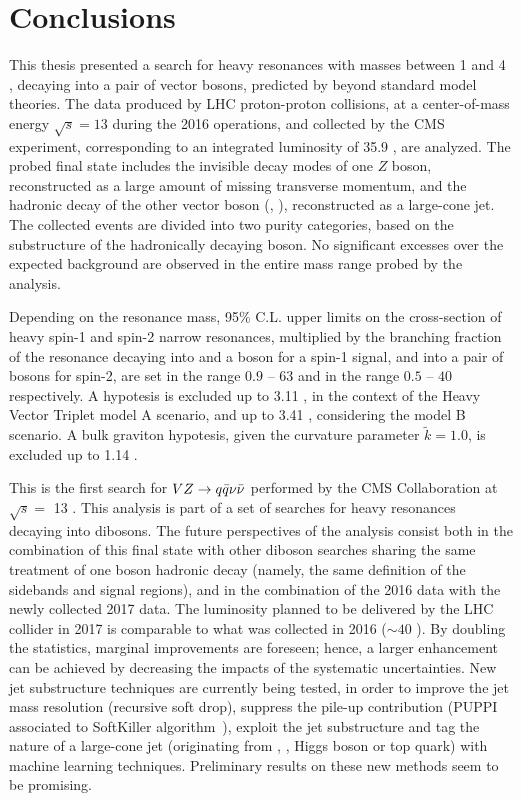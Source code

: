 \chapter{Conclusions}
\label{ch:conclusion}

This thesis presented a search for heavy resonances with masses between 1 \TeV and 4 \TeV, decaying into a pair of vector bosons, predicted by beyond standard model theories. The data produced by LHC proton-proton collisions, at a center-of-mass energy $\sqrt{s}=13$ \TeV during the 2016 operations, and collected by the CMS experiment, corresponding to an integrated luminosity of 35.9 \fbinv, are analyzed. The probed final state includes the invisible decay modes of one $Z$ boson, reconstructed as a large amount of missing transverse momentum, and the hadronic decay of the other vector boson (\Z, \W), reconstructed as a large-cone jet. The collected events are divided into two purity categories, based on the substructure of the hadronically decaying \V boson. No significant excesses over the expected background are observed in the entire mass range probed by the analysis.

\noindent Depending on the resonance mass, 95\% C.L. upper limits on the cross-section of heavy spin-1 and spin-2 narrow resonances, multiplied by the branching fraction of the resonance decaying into \Z and a \W boson for a spin-1 signal, and into a pair of \Z bosons for spin-2, are set in the range $0.9$ -- $63$ \fb and in the range $0.5$ -- $40$ \fb respectively. A \Wp hypotesis is excluded up to 3.11 \TeV, in the context of the Heavy Vector Triplet model A scenario, and up to 3.41 \TeV, considering the model B scenario. A bulk graviton hypotesis, given the curvature parameter $\tilde{k}=1.0$, is excluded up to 1.14 \TeV.

\vspace*{1\baselineskip}

\noindent This is the first search for $VZ \rightarrow q \bar{q} \nu \bar{\nu}$ performed by the CMS Collaboration at $\sqrt{s} = $ 13 \TeV. This analysis is part of a set of searches for heavy resonances decaying into dibosons. The future perspectives of the analysis consist both in the combination of this final state with other diboson searches sharing the same treatment of one boson hadronic decay (namely, the same definition of the sidebands and signal regions), and in the combination of the 2016 data with the newly collected 2017 data. The luminosity planned to be delivered by the LHC collider in 2017 is comparable to what was collected in 2016 ($\sim 40$ \fbinv). By doubling the statistics, marginal improvements are foreseen; hence, a larger enhancement can be achieved by decreasing the impacts of the systematic uncertainties. New jet substructure techniques are currently being tested, in order to improve the jet mass resolution (recursive soft drop), suppress the pile-up contribution (PUPPI associated to SoftKiller algorithm~\cite{Cacciari:2014gra}), exploit the jet substructure and tag the nature of a large-cone jet (originating from \W, \Z, Higgs boson or top quark) with machine learning techniques. Preliminary results on these new methods seem to be promising.

\clearpage

